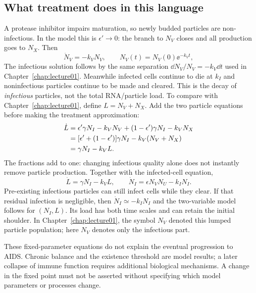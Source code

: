 \subsection{What treatment does in this language}\label{subsec:lec02:treatment}
A protease inhibitor impairs maturation, so newly budded particles are non-infectious. In the model this is $\epsilon'\to0$: the branch to $N_V$ closes and all production goes to $N_X$. Then
\begin{equation}\label{eq:lec02:treated}
\dot N_V=-k_VN_V,\qquad N_V(t)=N_V(0)\ee^{-k_Vt},
\end{equation}
The infectious solution follows by the same separation $\dd N_V/N_V=-k_V\dd t$ used in Chapter~\ref{chap:lecture01}. Meanwhile infected cells continue to die at $k_I$ and noninfectious particles continue to be made and cleared. This is the decay of \emph{infectious} particles, not the total RNA/particle load. To compare with Chapter~\ref{chap:lecture01}, define $L=N_V+N_X$. Add the two particle equations before making the treatment approximation:
\begin{align}
\dot L&=\epsilon'\gamma N_I-k_VN_V+(1-\epsilon')\gamma N_I-k_VN_X\notag\\
&=[\epsilon'+(1-\epsilon')]\gamma N_I-k_V(N_V+N_X)\notag\\
&=\gamma N_I-k_VL.\label{eq:lec02:load-sum-steps}
\end{align}
The fractions add to one: changing infectious quality alone does not instantly remove particle production. Together with the infected-cell equation,
\begin{equation}\label{eq:lec02:total-load}
\dot L=\gamma N_I-k_VL,
\qquad \dot N_I=\epsilon N_VN_U-k_IN_I.
\end{equation}
Pre-existing infectious particles can still infect cells while they clear. If that residual infection is negligible, then $\dot N_I\simeq-k_IN_I$ and the two-variable model follows for $(N_I,L)$. Its load has both time scales and can retain the initial shoulder. In Chapter~\ref{chap:lecture01}, the symbol $N_V$ denoted this lumped particle population; here $N_V$ denotes only the infectious part.

These fixed-parameter equations do not explain the eventual progression to AIDS. Chronic balance and the existence threshold are model results; a later collapse of immune function requires additional biological mechanisms. A change in the fixed point must not be asserted without specifying which model parameters or processes change.

